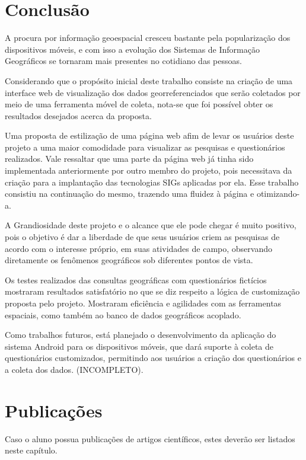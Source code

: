 \documentclass[
	12pt,				%
    oneside,			%
	a4paper,			%
	english,			%
	french,				%
	spanish,			%
	brazil,				%
	]{abntex2}
\begin{document}
\chapter{Conclusão}

A procura por informação geoespacial cresceu bastante pela popularização dos dispositivos móveis, e com isso a evolução dos Sistemas de Informação Geográficos se tornaram mais presentes no cotidiano das pessoas.

Considerando que o propósito inicial deste trabalho consiste na criação de uma interface web de visualização dos dados georreferenciados que serão coletados por meio de uma ferramenta móvel de coleta, nota-se que foi possível obter os resultados desejados acerca da proposta.

Uma proposta de estilização de uma página web afim de levar os usuários deste projeto a uma maior comodidade para visualizar as pesquisas e questionários realizados.
Vale ressaltar que uma parte da página web já tinha sido implementada anteriormente por outro membro do projeto, pois necessitava da criação para a implantação das tecnologias SIGs aplicadas por ela. Esse trabalho consistiu na continuação do mesmo, trazendo uma fluidez à página e otimizando-a.

A Grandiosidade deste projeto e o alcance que ele pode chegar é muito positivo, pois o objetivo é dar a liberdade de que seus usuários criem as pesquisas de acordo com o interesse próprio, em suas atividades de campo, observando diretamente os fenômenos geográficos sob diferentes pontos de vista.

Os testes realizados das consultas geográficas com questionários fictícios mostraram resultados satisfatório no que se diz respeito a lógica de customização proposta pelo projeto. Mostraram eficiência e agilidades com as ferramentas espaciais, como também ao banco de dados geográficos acoplado.

Como trabalhos futuros, está planejado o desenvolvimento da aplicação do sistema Android para os dispositivos móveis, que dará suporte à coleta de questionários customizados, permitindo aos usuários a criação dos questionários e a coleta dos dados.
(INCOMPLETO).


\chapter{Publicações}
Caso o aluno possua publicações de artigos científicos, estes deverão ser listados neste capítulo.
\end{document}
